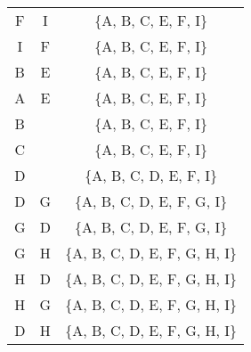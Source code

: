 \begin{naloga}
\begin{odgovor}
\begin{tabela}
\begin{tabular}{c|c|c}
F & I & \{A, B, C, E, F, I\} \\
I & F & \{A, B, C, E, F, I\} \\
B & E & \{A, B, C, E, F, I\} \\
A & E & \{A, B, C, E, F, I\} \\
B & & \{A, B, C, E, F, I\} \\
C & & \{A, B, C, E, F, I\} \\
D & & \{A, B, C, D, E, F, I\} \\
D & G &\{A, B, C, D, E, F, G, I\} \\
G & D & \{A, B, C, D, E, F, G, I\} \\
G & H & \{A, B, C, D, E, F, G, H, I\} \\
H & D & \{A, B, C, D, E, F, G, H, I\} \\
H & G & \{A, B, C, D, E, F, G, H, I\} \\
D & H & \{A, B, C, D, E, F, G, H, I\} \\
\end{tabular}
\end{tabela}

\begin{slika}
\end{slika}

\end{odgovor}
\end{naloga}
